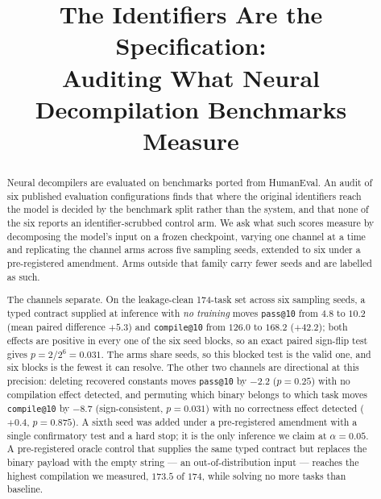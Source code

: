 \documentclass[conference]{IEEEtran}
\makeatletter
\newcommand{\passat}[1]{\texttt{pass@#1}\xspace}
\newcommand{\compileat}[1]{\texttt{compile@#1}\xspace}
\makeatother
\begin{document}
\title{The Identifiers Are the Specification:\\
Auditing What Neural Decompilation Benchmarks Measure}

\author{
}

\maketitle

\begin{abstract}
Neural decompilers are evaluated on benchmarks ported from HumanEval. An audit
of six published evaluation configurations finds that where the original
identifiers reach the model is decided by the benchmark split rather than the
system, and that none of the six reports an identifier-scrubbed control arm. We
ask what such scores measure by decomposing the
model's input on a frozen checkpoint, varying one channel at a time and
replicating the channel arms across five sampling seeds, extended to six under a
pre-registered amendment. Arms outside that family carry fewer seeds and are
labelled as such.

The channels separate. On the leakage-clean 174-task set across six sampling
seeds, a typed contract supplied at inference with \emph{no training} moves
\passat{10} from $4.8$ to $10.2$ (mean paired difference $+5.3$) and
\compileat{10} from $126.0$ to $168.2$ ($+42.2$); both effects are positive in
every one of the six seed blocks, so an exact paired sign-flip test gives
$p{=}2/2^6=0.031$. The arms share seeds, so this blocked test is the valid one,
and six blocks is the fewest it can resolve. The other two channels are
directional at this precision: deleting recovered constants moves \passat{10} by
$-2.2$ ($p{=}0.25$) with no compilation effect detected, and permuting which
binary belongs to which task moves \compileat{10} by $-8.7$ (sign-consistent,
$p{=}0.031$) with no correctness effect detected ($+0.4$, $p{=}0.875$). A
sixth seed was added under a pre-registered amendment with a single confirmatory
test and a hard stop; it is the only inference we claim at $\alpha{=}0.05$. A pre-registered oracle control that supplies
the same typed contract but replaces the binary payload with the empty string ---
an out-of-distribution input --- reaches the highest compilation we measured,
$173.5$ of $174$, while solving no more tasks than baseline.


\end{abstract}
\end{document}
